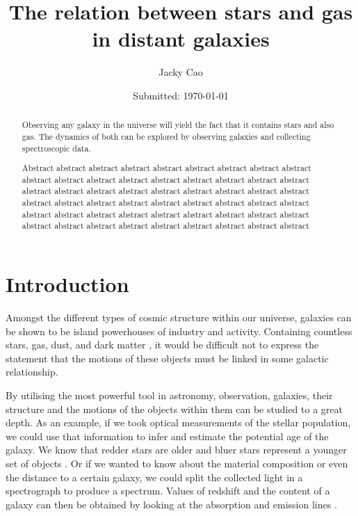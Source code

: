 \documentclass[12pt, onecolumn]{revtex4}    %
\begin{document}
                     


\title{The relation between stars and gas in distant galaxies} 
\date{Submitted: \today{}}
\author{Jacky Cao}

\begin{abstract}              
 
 Observing any galaxy in the universe will yield the fact that it contains stars and also gas. The dynamics of both can be explored by observing galaxies and collecting spectroscopic data. 
 
Abstract abstract abstract abstract abstract abstract abstract abstract abstract abstract abstract abstract abstract abstract abstract abstract abstract abstract abstract abstract abstract abstract abstract abstract abstract abstract abstract abstract abstract abstract abstract abstract abstract abstract abstract abstract abstract abstract abstract abstract abstract abstract abstract abstract abstract abstract abstract abstract abstract abstract abstract abstract abstract abstract 

\end{abstract}

\maketitle

\tableofcontents

\newpage

\section{Introduction} 

Amongst the different types of cosmic structure within our universe, galaxies can be shown to be island powerhouses of industry and activity. Containing countless stars, gas, dust, and dark matter \cite{carroll_astro}, it would be difficult not to express the statement that the motions of these objects must be linked in some galactic relationship. 

By utilising the most powerful tool in astronomy, observation, galaxies, their structure and the motions of the objects within them can be studied to a great depth. As an example, if we took optical measurements of the stellar population, we could use that information to infer and estimate the potential age of the galaxy. We know that redder stars are older and bluer stars represent a younger set of objects \cite{carroll_astro}. Or if we wanted to know about the material composition or even the distance to a certain galaxy, we could split the collected light in a spectrograph to produce a spectrum. Values of redshift and the content of a galaxy can then be obtained by looking at the absorption and emission lines \cite{carroll_astro}.
\end{document}
